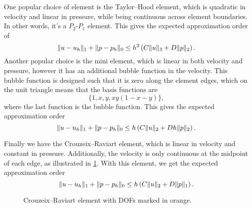 One popular choice of element is the Taylor--Hood element, %
which is quadratic in velocity and linear in pressure, while being continuous across element boundaries.
In other words, it's a $P_2$-$P_1$ element.
This gives the expected approximation order of
\begin{equation}
    \lVert u - u_h\rVert_{1} + \lVert p - p_h\rVert_{0} \leq h^2 \left(
        C \lVert u\rVert_{3} + D \lVert p\rVert_{2}
    \right).
\end{equation}
Another popular choice is the mini element, which is linear in both velocity and pressure, however it has an additional bubble function in the velocity.
This bubble function is designed such that it is zero along the element edges, which on the unit triangle means that the basis functions are
\begin{equation}
    \{ 1, x, y, xy(1 - x - y) \},
\end{equation}
where the last function is the bubble function.
This gives the expected approximation order
\begin{equation}
    \lVert u - u_h\rVert_{1} + \lVert p - p_h\rVert_{0} \leq h \left(
        C \lVert u\rVert_{2} + D h \lVert p\rVert_{2}
    \right).
\end{equation}

Finally we have the Crouzeix--Raviart element, %
which is linear in velocity and constant in pressure.
Additionally, the velocity is only continuous at the midpoint of each edge,
as illustrated in \cref{fig:crouzeix_raviart}.
With this element, we get the expected approximation order
\begin{equation}
    \lVert u - u_h\rVert_{1} + \lVert p - p_h\rVert_{0} \leq h \left(
        C \lVert u\rVert_{2} + D \lVert p\rVert_{1}
    \right).
\end{equation}

\begin{figure}[htbp]
    \centering
    \caption{
        Crouzeix--Raviart element with DOFs marked in orange.%
        \label{fig:crouzeix_raviart}
    }
\end{figure}